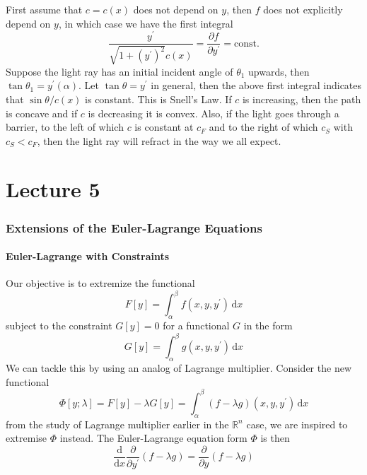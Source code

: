\documentclass[a4paper]{article}
\begin{document}
First assume that $c=c(x)$ does not depend on $y$, then $f$ does not explicitly depend on $y$, in which case we have the first integral
$$\frac{y^\prime}{\sqrt{1+(y^\prime)^2}c(x)}=\frac{\partial f}{\partial y^\prime}=\text{const.}$$
Suppose the light ray has an initial incident angle of $\theta_1$ upwards, then $\tan\theta_1=y^\prime(\alpha)$.
Let $\tan\theta=y^\prime$ in general, then the above first integral indicates that $\sin\theta/c(x)$ is constant.
This is Snell's Law.
If $c$ is increasing, then the path is concave and if $c$ is decreasing it is convex.
Also, if the light goes through a barrier, to the left of which $c$ is constant at $c_F$ and to the right of which $c_S$ with $c_S<c_F$, then the light ray will refract in the way we all expect.

\newpage
\part*{Lecture 5}
\section{Extensions of the Euler-Lagrange Equations}
\subsection{Euler-Lagrange with Constraints}
Our objective is to extremize the functional
$$F[y]=\int_\alpha^\beta f(x,y,y^\prime)\,\mathrm dx$$
subject to the constraint $G[y]=0$ for a functional $G$ in the form
$$G[y]=\int_\alpha^\beta g(x,y,y^\prime)\,\mathrm dx$$
We can tackle this by using an analog of Lagrange multiplier.
Consider the new functional
$$\Phi[y;\lambda]=F[y]-\lambda G[y]=\int_\alpha^\beta (f-\lambda g)(x,y,y^\prime)\,\mathrm dx$$
from the study of Lagrange multiplier earlier in the $\mathbb R^n$ case, we are inspired to extremise $\Phi$ instead.
The Euler-Lagrange equation form $\Phi$ is then
$$\frac{\mathrm d}{\mathrm dx}\frac{\partial}{\partial y^\prime}(f-\lambda g)=\frac{\partial}{\partial y}(f-\lambda g)$$
\end{document}
